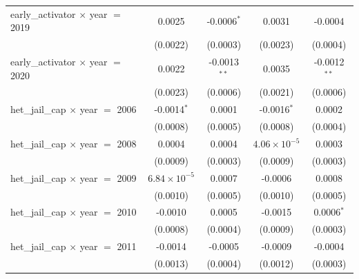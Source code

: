 \begin{tabular}{lcccc}
   early\_activator $\times$ year $=$ 2019              & 0.0025                & -0.0006$^{*}$             & 0.0031                 & -0.0004\\   
                                                        & (0.0022)              & (0.0003)                  & (0.0023)               & (0.0004)\\   
   early\_activator $\times$ year $=$ 2020              & 0.0022                & -0.0013$^{**}$            & 0.0035                 & -0.0012$^{**}$\\   
                                                        & (0.0023)              & (0.0006)                  & (0.0021)               & (0.0006)\\   
   het\_jail\_cap $\times$ year $=$ 2006                & -0.0014$^{*}$         & 0.0001                    & -0.0016$^{*}$          & 0.0002\\   
                                                        & (0.0008)              & (0.0005)                  & (0.0008)               & (0.0004)\\   
   het\_jail\_cap $\times$ year $=$ 2008                & 0.0004                & 0.0004                    & $4.06\times 10^{-5}$   & 0.0003\\   
                                                        & (0.0009)              & (0.0003)                  & (0.0009)               & (0.0003)\\   
   het\_jail\_cap $\times$ year $=$ 2009                & $6.84\times 10^{-5}$  & 0.0007                    & -0.0006                & 0.0008\\   
                                                        & (0.0010)              & (0.0005)                  & (0.0010)               & (0.0005)\\   
   het\_jail\_cap $\times$ year $=$ 2010                & -0.0010               & 0.0005                    & -0.0015                & 0.0006$^{*}$\\   
                                                        & (0.0008)              & (0.0004)                  & (0.0009)               & (0.0003)\\   
   het\_jail\_cap $\times$ year $=$ 2011                & -0.0014               & -0.0005                   & -0.0009                & -0.0004\\   
                                                        & (0.0013)              & (0.0004)                  & (0.0012)               & (0.0003)\\   

\end{tabular}
